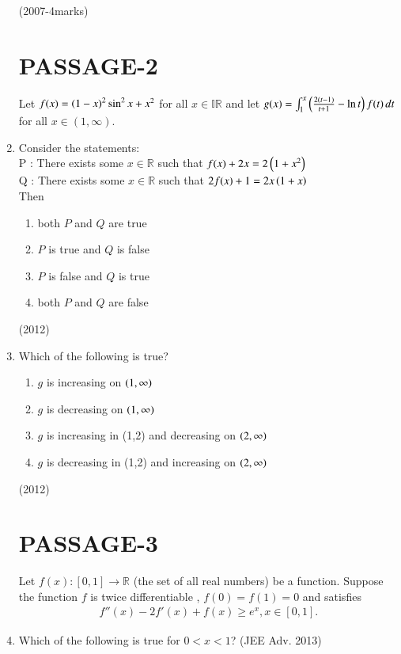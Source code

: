 \documentclass[journal,,12pt,twocolumn]{IEEEtran}
\theoremstyle{remark}
\begin{document}
\begin{enumerate}
\hfill {(2007-4marks)}
\section*{PASSAGE-2}
Let $f(x)=\left(1-x\right)^2 \sin^2 x + x^2$ for all $x \in \mathbb{IR}$ and let $g(x)=
\int_{1}^{x} \left(\frac{2(t-1)}{t+1} - \ln t\right)  f(t) \, dt $ for all $x \in (1 ,\infty)$.
\item Consider the statements:\\
P : There exists some $x \in \mathbb{R}$ such that $f(x) + 2x = 2\left(1+x^2\right)$\\
Q : There exists some $x \in\mathbb{R}$ such that $2f(x) + 1 = 2x\left(1+x\right)$\\
    Then
\begin{enumerate}
\item both $P$ and $Q$ are true
\item $P$ is true and $Q$ is false
\item $P$ is false and $Q$ is true
\item both $P$ and $Q$ are false
\end{enumerate}


\hfill{(2012)}
\item Which of the following is true?
\begin{enumerate}

\item $g$ is increasing on $\left(1,\infty\right)$
\item $g$ is decreasing on $\left(1,\infty\right)$
\item $g$ is increasing in (1,2) and decreasing on $\left(2,\infty\right)$
\item $g$ is decreasing in (1,2) and increasing on $\left(2,\infty\right)$

\end{enumerate}
\hfill{(2012)}

\section*{PASSAGE-3}
Let $f(x) : [0,1] \to\mathbb{R}$
(the set of all real numbers) be a function. Suppose the function $f$ is twice differentiable , $f(0)=f(1)=0$ and satisfies \begin{align*} f''(x)-2f'(x)+f(x) \geq e^x , x \in [0,1].\end{align*} 

\item Which of the following is true for $0<x<1$?
\hfill{(JEE Adv. 2013)}


\end{enumerate}
\end{document}
